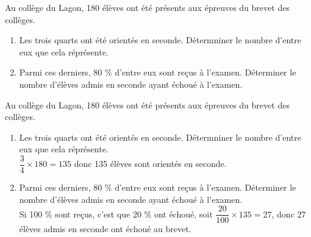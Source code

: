 \begin{exercice*}
    Au collège du Lagon, \num{180} élèves ont été présents aux épreuves du brevet des collèges.
    \begin{enumerate}
        \item Les trois quarts ont été orientés en seconde. Détermniner le nombre d'entre eux que cela réprésente.
        \item Parmi ces derniers, \num{80} \% d'entre eux sont reçus à l'examen. Déterminer le nombre d'élèves admis en seconde ayant échoué à l'examen.
    \end{enumerate}
\end{exercice*}
\begin{corrige}
    Au collège du Lagon, \num{180} élèves ont été présents aux épreuves du brevet des collèges.
    
    \begin{enumerate}
        \item Les trois quarts ont été orientés en seconde. Détermniner le nombre d'entre eux que cela réprésente.\\
        {\red $\dfrac{3}{4}\times 180 = 135$ donc 135 élèves sont orientés en seconde.}        
        \item Parmi ces derniers, \num{80} \% d'entre eux sont reçus à l'examen. Déterminer le nombre d'élèves admis en seconde ayant échoué à l'examen.\\
        {\red Si \num{100} \% sont reçus, c'est que \num{20} \% ont échoué, soit $\dfrac{20}{100}\times 135 = 27$, donc 27 élèves admis en seconde ont échoué au brevet.}
    \end{enumerate}
\end{corrige}


